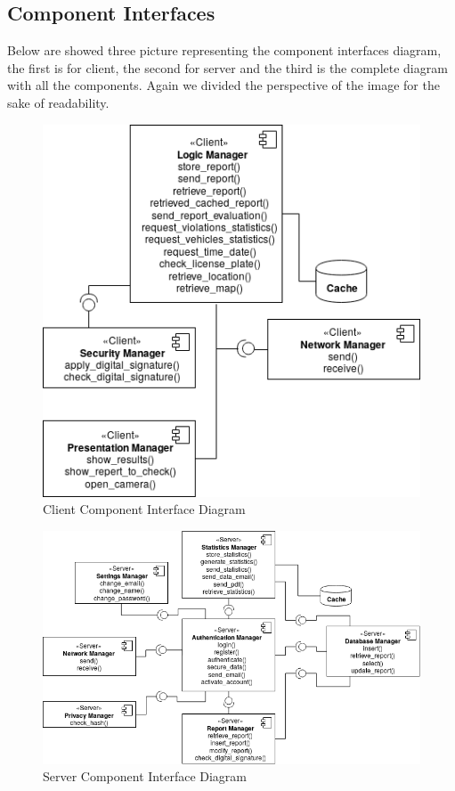 \documentclass{article}
\begin{document}
\subsection{Component Interfaces}

Below are showed three picture representing the component interfaces diagram, the first is for client, the second
for server and the third is the complete diagram with all the components. Again we divided the perspective
of the image for the sake of readability.

\begin{figure}[H]
    \centering
    \includegraphics[scale=0.5]{img/component_interface_diagrams/client_component_interface.png}
    \caption{Client Component Interface Diagram}
\end{figure}
\begin{figure}[H]
    \centering
    \includegraphics[scale=0.5]{img/component_interface_diagrams/server_component_interface.png}
    \caption{Server Component Interface Diagram}
\end{figure}
\end{document}
